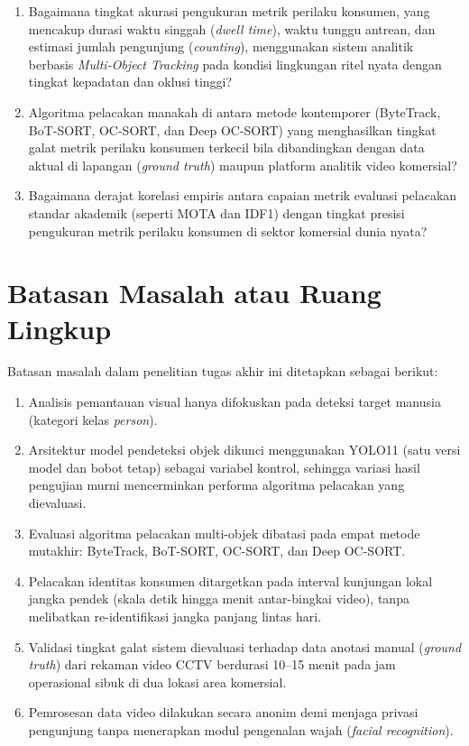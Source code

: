 \begin{enumerate}
    \item Bagaimana tingkat akurasi pengukuran metrik perilaku konsumen, yang mencakup durasi waktu singgah (\textit{dwell time}), waktu tunggu antrean, dan estimasi jumlah pengunjung (\textit{counting}), menggunakan sistem analitik berbasis \textit{Multi-Object Tracking} pada kondisi lingkungan ritel nyata dengan tingkat kepadatan dan oklusi tinggi?
    \item Algoritma pelacakan manakah di antara metode kontemporer (ByteTrack, BoT-SORT, OC-SORT, dan Deep OC-SORT) yang menghasilkan tingkat galat metrik perilaku konsumen terkecil bila dibandingkan dengan data aktual di lapangan (\textit{ground truth}) maupun platform analitik video komersial?
    \item Bagaimana derajat korelasi empiris antara capaian metrik evaluasi pelacakan standar akademik (seperti MOTA dan IDF1) dengan tingkat presisi pengukuran metrik perilaku konsumen di sektor komersial dunia nyata?
\end{enumerate}

\section{Batasan Masalah atau Ruang Lingkup}

Batasan masalah dalam penelitian tugas akhir ini ditetapkan sebagai berikut:

\begin{enumerate}
    \item Analisis pemantauan visual hanya difokuskan pada deteksi target manusia (kategori kelas \textit{person}).
    \item Arsitektur model pendeteksi objek dikunci menggunakan YOLO11 (satu versi model dan bobot tetap) sebagai variabel kontrol, sehingga variasi hasil pengujian murni mencerminkan performa algoritma pelacakan yang dievaluasi.
    \item Evaluasi algoritma pelacakan multi-objek dibatasi pada empat metode mutakhir: ByteTrack, BoT-SORT, OC-SORT, dan Deep OC-SORT.
    \item Pelacakan identitas konsumen ditargetkan pada interval kunjungan lokal jangka pendek (skala detik hingga menit antar-bingkai video), tanpa melibatkan re-identifikasi jangka panjang lintas hari.
    \item Validasi tingkat galat sistem dievaluasi terhadap data anotasi manual (\textit{ground truth}) dari rekaman video CCTV berdurasi 10--15 menit pada jam operasional sibuk di dua lokasi area komersial.
    \item Pemrosesan data video dilakukan secara anonim demi menjaga privasi pengunjung tanpa menerapkan modul pengenalan wajah (\textit{facial recognition}).
\end{enumerate}

